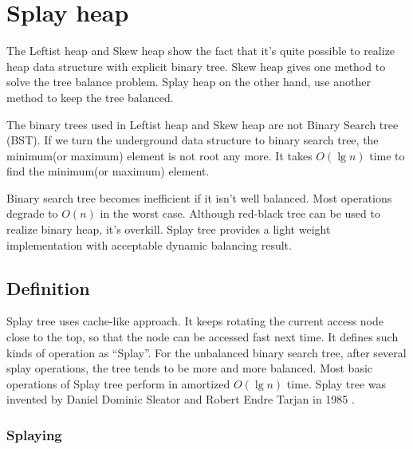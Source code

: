 \documentclass[b5paper]{article}
\begin{document}

\section{Splay heap}
\label{splayheap}

The Leftist heap and Skew heap show the fact that it's quite possible to realize
heap data structure with explicit binary tree.
Skew heap gives one method to solve the tree balance problem. Splay heap
on the other hand, use another method to keep the tree balanced.

The binary trees used in Leftist heap and Skew heap
are not Binary Search tree (BST). If we turn the underground
data structure to binary search tree, the minimum(or maximum)
element is not root any more. It takes $O(\lg n)$ time
to find the minimum(or maximum) element.

Binary search tree becomes inefficient if it isn't well
balanced. Most operations degrade to $O(n)$ in the worst case.
Although red-black tree can be used to realize
binary heap, it's overkill. Splay tree provides a light weight
implementation with acceptable dynamic balancing result.


\subsection{Definition}

Splay tree uses cache-like approach. It keeps rotating the current
access node close to the top, so that the node can be accessed fast
next time. It defines such kinds of operation as ``Splay''. For the
unbalanced binary search tree, after several splay operations, the
tree tends to be more and more balanced. Most basic operations of
Splay tree perform in amortized $O(\lg n)$ time. Splay tree was invented
by Daniel Dominic Sleator and Robert Endre Tarjan in 1985\cite{wiki-splay-tree}
\cite{self-adjusting-trees}.

\subsubsection{Splaying}
\end{document}
